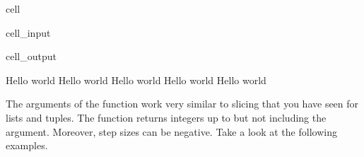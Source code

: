 \documentclass[letterpaper,10pt,english]{jupyterBook}
\begin{document}
\begin{sphinxuseclass}{cell}\begin{sphinxVerbatimInput}

\begin{sphinxuseclass}{cell_input}
\begin{sphinxVerbatim}[commandchars=\\\{\}]
      
\end{sphinxVerbatim}

\end{sphinxuseclass}\end{sphinxVerbatimInput}
\begin{sphinxVerbatimOutput}

\begin{sphinxuseclass}{cell_output}
\begin{sphinxVerbatim}[commandchars=\\\{\}]
Hello world
Hello world
Hello world
Hello world
Hello world
\end{sphinxVerbatim}

\end{sphinxuseclass}\end{sphinxVerbatimOutput}

\end{sphinxuseclass}
\sphinxAtStartPar
The arguments of the  function work very similar to slicing that you have seen for lists and tuples. The function returns integers up to but not including the  argument. Moreover, step sizes can be negative. Take a look at the following examples.
\end{document}
